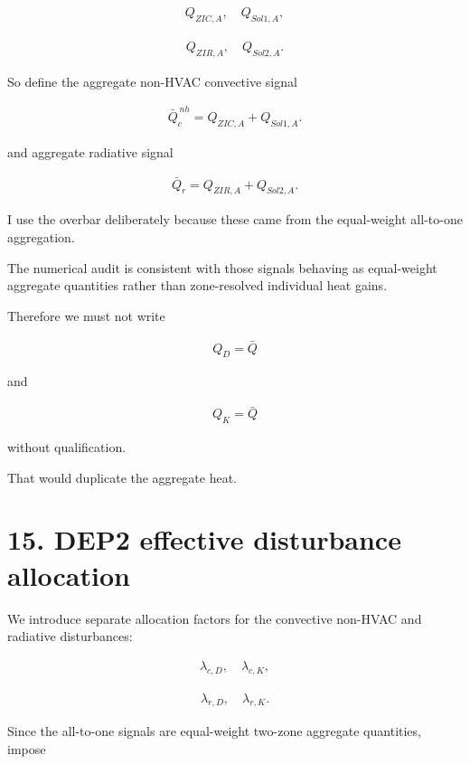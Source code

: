 \documentclass[11pt]{article}
\begin{document}
\begin{align}
Q_{ZIC,A},
\quad
Q_{Sol1,A},
\end{align}

\begin{align}
Q_{ZIR,A},
\quad
Q_{Sol2,A}.
\end{align}

So define the aggregate non-HVAC convective signal

\begin{align}
\boxed{
\bar Q_c^{\,nh}
=
Q_{ZIC,A}+Q_{Sol1,A}.
}
\tag{46}
\end{align}

and aggregate radiative signal

\begin{align}
\boxed{
\bar Q_r
=
Q_{ZIR,A}+Q_{Sol2,A}.
}
\tag{47}
\end{align}

I use the overbar deliberately because these came from the equal-weight all-to-one aggregation.

The numerical audit is consistent with those signals behaving as equal-weight aggregate quantities rather than zone-resolved individual heat gains.

Therefore we must not write

\begin{align}
Q_D=\bar Q
\end{align}

and

\begin{align}
Q_K=\bar Q
\end{align}

without qualification.

That would duplicate the aggregate heat.

\section*{15. DEP2 effective disturbance allocation}

We introduce separate allocation factors for the convective non-HVAC and radiative disturbances:

\begin{align}
\lambda_{c,D},
\quad
\lambda_{c,K},
\end{align}

\begin{align}
\lambda_{r,D},
\quad
\lambda_{r,K}.
\end{align}

Since the all-to-one signals are equal-weight two-zone aggregate quantities, impose
\end{document}
